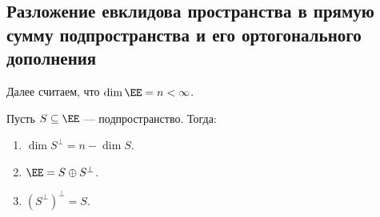 \subsection{Разложение евклидова пространства в прямую сумму подпространства и его ортогонального дополнения}

Далее считаем, что $\dim \EE = n < \infty$.

\begin{proposal}
    Пусть $S \subseteq \EE$ --- подпространство.
    Тогда:
    \begin{enumerate}
    \item $\dim S^{\perp} = n - \dim S$.
    \item $\EE = S \oplus S^{\perp}$.
    \item $(S^{\perp})^{\perp} = S$.
    \end{enumerate}
\end{proposal}

